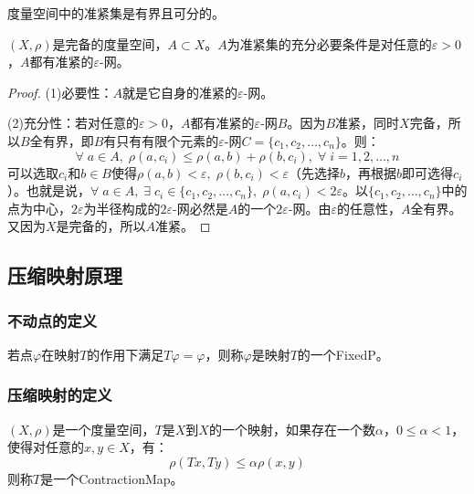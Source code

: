 \begin{corollary}
	度量空间中的准紧集是有界且可分的。
\end{corollary}
\begin{theorem}
	$(X,\rho)$是完备的度量空间，$A\subset X$。$A$为准紧集的充分必要条件是对任意的$\varepsilon>0$，$A$都有准紧的$\varepsilon$-网。
\end{theorem}
\begin{proof}
	(1)必要性：$A$就是它自身的准紧的$\varepsilon$-网。\par
	(2)充分性：若对任意的$\varepsilon>0$，$A$都有准紧的$\varepsilon$-网$B$。因为$B$准紧，同时$X$完备，所以$B$全有界，即$B$有只有有限个元素的$\varepsilon$-网$C=\{c_1,c_2,\dots,c_n\}$。则：
	\begin{equation*}
		\forall\;a\in A,\;\rho(a,c_i)\leqslant\rho(a,b)+\rho(b,c_i),\;\forall\;i=1,2,\dots,n
	\end{equation*}
	可以选取$c_i$和$b\in B$使得$\rho(a,b)<\varepsilon,\;\rho(b,c_i)<\varepsilon$（先选择$b$，再根据$b$即可选得$c_i$）。也就是说，$\forall\;a\in A,\;\exists\;c_i\in\{c_1,c_2,\dots,c_n\},\;\rho(a,c_i)<2\varepsilon$。以$\{c_1,c_2,\dots,c_n\}$中的点为中心，$2\varepsilon$为半径构成的$2\varepsilon$-网必然是$A$的一个$2\varepsilon$-网。由$\varepsilon$的任意性，$A$全有界。又因为$X$是完备的，所以$A$准紧。
\end{proof}

\subsection{压缩映射原理}
\subsubsection{不动点的定义}
\begin{definition}
	若点$\varphi$在映射$T$的作用下满足$T\varphi=\varphi$，则称$\varphi$是映射$T$的一个\gls{FixedP}。
\end{definition}
\subsubsection{压缩映射的定义}
\begin{definition}
	$(X,\rho)$是一个度量空间，$T$是$X$到$X$的一个映射，如果存在一个数$\alpha$，$0\leqslant\alpha<1$，使得对任意的$x,y\in X$，有：
	\begin{equation*}
		\rho(Tx,Ty)\leqslant\alpha\rho(x,y)
	\end{equation*}
	则称$T$是一个\gls{ContractionMap}。
\end{definition}

